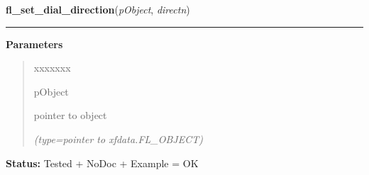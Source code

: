     \label{xformslib:library:fl_set_dial_direction}

    \vspace{0.5ex}

\hspace{.8\funcindent}\begin{boxedminipage}{\funcwidth}

    \raggedright \textbf{fl\_set\_dial\_direction}(\textit{pObject}, \textit{directn})

    \vspace{-1.5ex}

    \rule{\textwidth}{0.5\fboxrule}
\setlength{\parskip}{2ex}
\setlength{\parskip}{1ex}
      \textbf{Parameters}
      \vspace{-1ex}

      \begin{quote}
        \begin{Ventry}{xxxxxxx}

          \item[pObject]

          pointer to object

            {\it (type=pointer to xfdata.FL\_OBJECT)}

        \end{Ventry}

      \end{quote}

\textbf{Status:} Tested + NoDoc + Example = OK



    \end{boxedminipage}

    \label{xformslib:library:fl_get_dirlist}

    \vspace{0.5ex}

